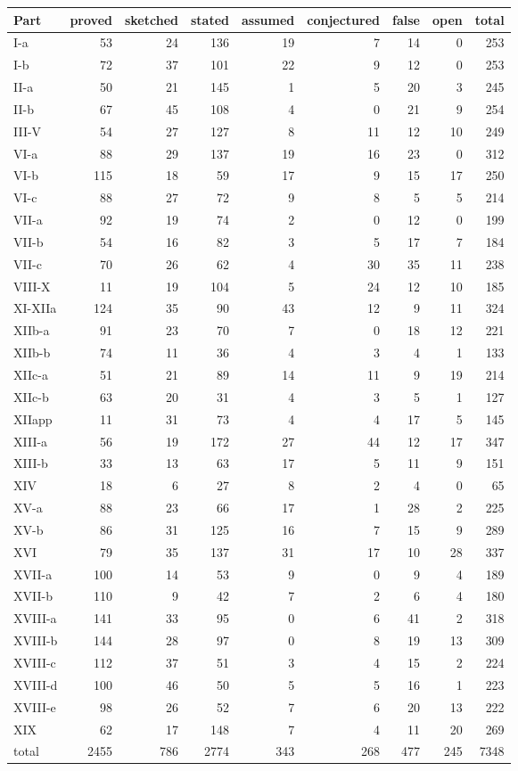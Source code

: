 \documentclass[11pt,oneside]{book}
\begin{document}
\begin{center}\small
\begin{tabular}{lrrrrrrrr}
\toprule
Part & proved & sketched & stated & assumed & conjectured & false & open & total \\
\midrule
I-a & 53 & 24 & 136 & 19 & 7 & 14 & 0 & 253 \\
I-b & 72 & 37 & 101 & 22 & 9 & 12 & 0 & 253 \\
II-a & 50 & 21 & 145 & 1 & 5 & 20 & 3 & 245 \\
II-b & 67 & 45 & 108 & 4 & 0 & 21 & 9 & 254 \\
III-V & 54 & 27 & 127 & 8 & 11 & 12 & 10 & 249 \\
VI-a & 88 & 29 & 137 & 19 & 16 & 23 & 0 & 312 \\
VI-b & 115 & 18 & 59 & 17 & 9 & 15 & 17 & 250 \\
VI-c & 88 & 27 & 72 & 9 & 8 & 5 & 5 & 214 \\
VII-a & 92 & 19 & 74 & 2 & 0 & 12 & 0 & 199 \\
VII-b & 54 & 16 & 82 & 3 & 5 & 17 & 7 & 184 \\
VII-c & 70 & 26 & 62 & 4 & 30 & 35 & 11 & 238 \\
VIII-X & 11 & 19 & 104 & 5 & 24 & 12 & 10 & 185 \\
XI-XIIa & 124 & 35 & 90 & 43 & 12 & 9 & 11 & 324 \\
XIIb-a & 91 & 23 & 70 & 7 & 0 & 18 & 12 & 221 \\
XIIb-b & 74 & 11 & 36 & 4 & 3 & 4 & 1 & 133 \\
XIIc-a & 51 & 21 & 89 & 14 & 11 & 9 & 19 & 214 \\
XIIc-b & 63 & 20 & 31 & 4 & 3 & 5 & 1 & 127 \\
XIIapp & 11 & 31 & 73 & 4 & 4 & 17 & 5 & 145 \\
XIII-a & 56 & 19 & 172 & 27 & 44 & 12 & 17 & 347 \\
XIII-b & 33 & 13 & 63 & 17 & 5 & 11 & 9 & 151 \\
XIV & 18 & 6 & 27 & 8 & 2 & 4 & 0 & 65 \\
XV-a & 88 & 23 & 66 & 17 & 1 & 28 & 2 & 225 \\
XV-b & 86 & 31 & 125 & 16 & 7 & 15 & 9 & 289 \\
XVI & 79 & 35 & 137 & 31 & 17 & 10 & 28 & 337 \\
XVII-a & 100 & 14 & 53 & 9 & 0 & 9 & 4 & 189 \\
XVII-b & 110 & 9 & 42 & 7 & 2 & 6 & 4 & 180 \\
XVIII-a & 141 & 33 & 95 & 0 & 6 & 41 & 2 & 318 \\
XVIII-b & 144 & 28 & 97 & 0 & 8 & 19 & 13 & 309 \\
XVIII-c & 112 & 37 & 51 & 3 & 4 & 15 & 2 & 224 \\
XVIII-d & 100 & 46 & 50 & 5 & 5 & 16 & 1 & 223 \\
XVIII-e & 98 & 26 & 52 & 7 & 6 & 20 & 13 & 222 \\
XIX & 62 & 17 & 148 & 7 & 4 & 11 & 20 & 269 \\
\midrule
total & 2455 & 786 & 2774 & 343 & 268 & 477 & 245 & 7348 \\
\bottomrule
\end{tabular}
\end{center}
\end{document}
